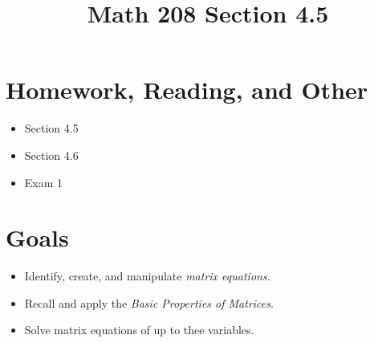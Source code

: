 \documentclass[14pt]{extarticle}
\title{\vspace{-5ex}Math 208 Section 4.5}
\date{\vspace{-10ex}}
\begin{document}
\maketitle		
\section*{Homework, Reading, and Other}
\begin{itemize}
	\item Section 4.5
	\item Section 4.6
	\item Exam 1
\end{itemize}

\section*{Goals}
\begin{itemize}
	\item Identify, create, and manipulate \textit{matrix equations}.
	\item Recall and apply the \textit{Basic Properties of Matrices}.
	\item Solve matrix equations of up to thee variables.
\end{itemize}
\end{document}
